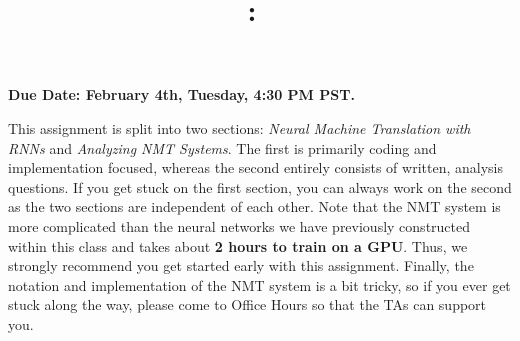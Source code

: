 \documentclass[answers]{exam}
\title{
\vspace{-1in}
\textmd{\textbf{\hmwkClass:\ \hmwkTitle} \\ \hmwkAuthorName}
}
\author{}
\date{}
\begin{document}
\maketitle
\vspace{-.5in}
\textbf{Due Date: February 4th, Tuesday, 4:30 PM PST.}


This assignment is split into two sections: \textit{Neural Machine Translation with RNNs} and \textit{Analyzing NMT Systems}. The first is primarily coding and implementation focused, whereas the second entirely consists of written, analysis questions. If you get stuck on the first section, you can always work on the second as the two sections are independent of each other. Note that the NMT system is more complicated than the neural networks we have previously constructed within this class and takes about \textbf{2 hours to train on a GPU}. Thus, we strongly recommend you get started early with this assignment. Finally, the notation and implementation of the NMT system is a bit tricky, so if you ever get stuck along the way, please come to Office Hours so that the TAs can support you. \newline

\begin{questions}
    
    
\end{questions}






\end{document}

